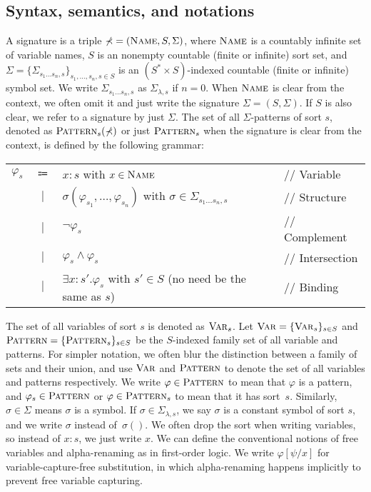 \documentclass[acmsmall,review,anonymous]{acmart}
\newcommand{\Name}{\textnormal{\textsc{Name}}}
\newcommand{\Var}{\textnormal{\textsc{Var}}}
\newcommand{\sig}{\mathbb{\Sigma}}
\newcommand{\Pattern}{\textnormal{\textsc{Pattern}}}
\newcommand{\ddd}{,\dots,}
\newcommand{\cln}{\mathbin{\!:\!}}
\newcommand{\doubleslash}{//\xspace}
\newcommand{\SigmaSub}[1]{\Sigma_{#1}}
\begin{document}
\subsection{Syntax, semantics, and notations}
\label{sec_syntax_semantics_notations}

A signature is a triple
$\sig = (\Name, S, \Sigma)$,
where
$\Name$ is
a countably infinite set of variable names,
$S$ is an nonempty countable (finite or infinite) sort set,
and $\Sigma = \{ \SigmaSub{s_1 \dots s_n ,s} \}_{s_1 \ddd s_n , s \in S}$
is an $(S^* \times S)$-indexed countable (finite or infinite) symbol set.
We write $\SigmaSub{s_1 \dots s_n , s}$ as
$\SigmaSub{\lambda , s}$ if $n = 0$.
When $\Name$ is clear from the context,
we often omit it and just write the signature $\sig = (S, \Sigma)$.
If $S$ is also clear, we refer to a signature
by just $\Sigma$.
The set of all $\sig$-patterns of sort $s$,
denoted as $\Pattern_s(\sig)$ or just $\Pattern_s$ when the signature is clear
from the context,
is defined by the following grammar:
\begin{center}
\begin{tabular}{rcll}
$\varphi_s$
& $\Coloneqq$
& $x \cln s$
  with $x \in \Name$
& \doubleslash Variable
\\
& $|$
& $\sigma(\varphi_{s_1} \ddd \varphi_{s_n})$
  with $\sigma \in \SigmaSub{s_1 \dots s_n , s}$
& \doubleslash Structure
\\
& $|$
& $\neg \varphi_s$
& \doubleslash Complement
\\
& $|$
& $\varphi_s \wedge \varphi_s$
& \doubleslash Intersection
\\
& $|$
& $\exists x \cln s'. \varphi_s$
  with $s' \in S$ (no need be the same as $s$)
& \doubleslash Binding
\end{tabular}
\end{center}
The set of all variables of sort $s$ is denoted as $\Var_s$.
Let $\Var = \{ \Var_s \}_{s \in S}$ and $\Pattern = \{ \Pattern_s \}_{s \in S}$
be the $S$-indexed family set of all variable and patterns.
For simpler notation,
we often blur the distinction between
a family of sets and their union,
and use $\Var$ and $\Pattern$
to denote the set of all variables and patterns respectively.
We write
$\varphi \in \Pattern$ to mean that $\varphi$ is a pattern,
and $\varphi_s \in \Pattern$ or $\varphi \in \Pattern_s$ to mean that
it has sort~$s$.
Similarly, $\sigma \in \Sigma$ means $\sigma$ is a symbol.
If $\sigma \in \SigmaSub{\lambda, s}$, we say $\sigma$
is a constant symbol of sort $s$, and
we write $\sigma$ instead of~$\sigma()$.
We often drop the sort when writing variables, 
so instead of $x \cln s$, we just write $x$.
We can define the conventional notions of free variables and
alpha-renaming as in first-order logic.
We write $\varphi [\psi/x]$ for variable-capture-free substitution,
in which alpha-renaming happens implicitly to prevent
free variable capturing.
\end{document}
